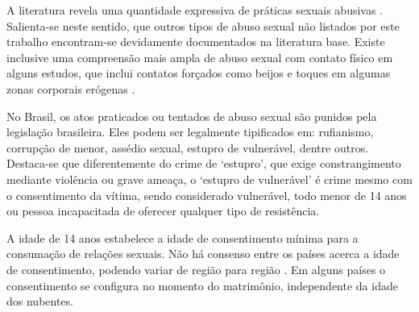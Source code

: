 \begin{parcolumns}{2}

\colplacechunks\vspace{-0.3cm}

\end{parcolumns}

A literatura revela uma quantidade expressiva de práticas sexuais abusivas \cite{sayao2006refazendo, santos2011guia, ibiapinainfluencias, ibiapinainfluencias, barros2016participaccao, lima2015violencia, habigzang2005abuso, moreschi2018violencia, deviolencia, saude2002notificacao}. Salienta-se neste sentido, que outros tipos de abuso sexual não listados por este trabalho encontram-se devidamente documentados na literatura base. Existe inclusive uma compreensão mais ampla de abuso sexual com contato físico em alguns estudos, que inclui contatos forçados como beijos e toques em algumas zonas corporais erógenas \cite{santos2009guia, sayao2006refazendo}.

No Brasil, os atos praticados ou tentados de abuso sexual são punidos pela legislação brasileira. Eles podem ser legalmente tipificados em: rufianismo, corrupção de menor, assédio sexual, estupro de vulnerável, dentre outros. Destaca-se que diferentemente do crime de `estupro', que exige constrangimento mediante violência ou grave ameaça, o `estupro de vulnerável' é crime mesmo com o consentimento da vítima, sendo considerado vulnerável, todo menor de 14 anos ou pessoa incapacitada de oferecer qualquer tipo de resistência. 

A idade de 14 anos estabelece a idade de consentimento mínima para a consumação de relações sexuais. Não há consenso entre os países acerca a idade de consentimento, podendo variar de região para região \cite{bullough2005age}. Em alguns países o consentimento se configura no momento do matrimônio, independente da idade dos nubentes. 

